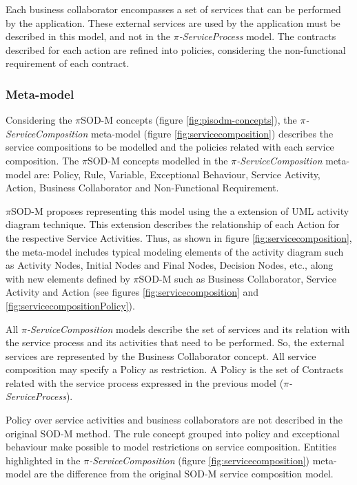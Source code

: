 Each business collaborator encompasses a set of services that can
be performed by the application. These external services are used by the 
application must be described in this model, and not in the
\textit{$\pi$-ServiceProcess} model. The contracts described for each action are
refined into policies, considering the non-functional requirement of each
contract.



 \subsubsection{Meta-model} 
 
 

Considering the $\pi$SOD-M concepts (figure \ref{fig:pisodm-concepts}), the
\textit{$\pi$-ServiceComposition} meta-model (figure
\ref{fig:servicecomposition}) describes the service compositions
to be modelled and the policies related with each service composition.
The $\pi$SOD-M concepts modelled in the \textit{$\pi$-ServiceComposition}
meta-model are: {\sc Policy, Rule, Variable, Exceptional Behaviour, Service
Activity, Action, Business Collaborator} and {\sc Non-Functional
Requirement}.

 $\pi$SOD-M proposes representing this model using the a extension of UML
 activity diagram technique. This extension describes the relationship of each {\sc Action} for the
respective {\sc Service Activities}. Thus, as shown in figure
\ref{fig:servicecomposition}, the meta-model includes typical modeling elements
of the activity diagram such as {\sc Activity Nodes}, {\sc Initial
Nodes} and {\sc Final Nodes}, {\sc Decision Nodes}, etc., along with
new elements defined by $\pi$SOD-M such as {\sc Business Collaborator},
{\sc Service Activity} and {\sc Action} (see
figures \ref{fig:servicecomposition} and \ref{fig:servicecompositionPolicy}).

All \textit{$\pi$-ServiceComposition} models
describe the set of services and its relation with the service process and its
activities that need to be performed. So, the external services
are represented by the {\sc Business Collaborator} concept. All service
composition may specify a {\sc Policy} as restriction. A {\sc Policy} is the
set of {\sc Contracts} related with the service process expressed in the
previous model (\textit{$\pi$-ServiceProcess}).

 

Policy over service activities and business collaborators are not described in
the original SOD-M method. The rule concept grouped into policy and
exceptional behaviour make possible to model restrictions on service composition. Entities
highlighted in the \textit{$\pi$-ServiceComposition} (figure
\ref{fig:servicecomposition}) meta-model are the difference from the original
SOD-M service composition model.



